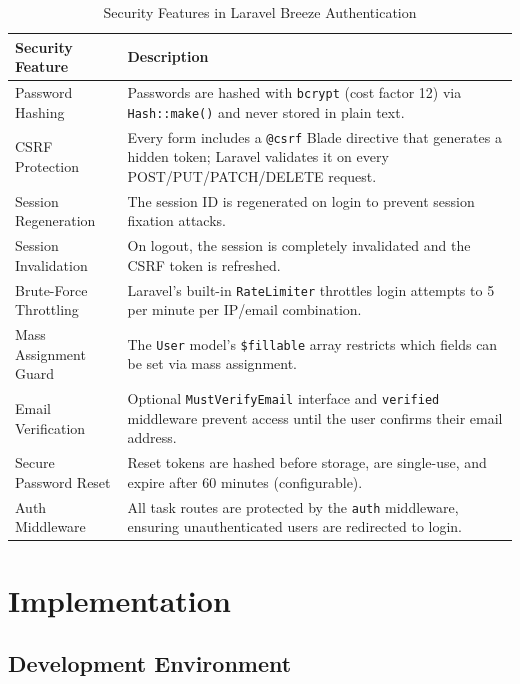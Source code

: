 \documentclass[12pt,a4paper]{report}
\begin{document}
\begin{titlepage}
\begin{table}[h!]
\centering
\caption{Security Features in Laravel Breeze Authentication}
\label{tab:security}
\renewcommand{\arraystretch}{1.3}
\begin{tabularx}{\textwidth}{@{}lX@{}}
\toprule
\textbf{Security Feature} & \textbf{Description} \\
\midrule
Password Hashing       & Passwords are hashed with \texttt{bcrypt} (cost factor 12) via \texttt{Hash::make()} and never stored in plain text. \\
CSRF Protection        & Every form includes a \texttt{@csrf} Blade directive that generates a hidden token; Laravel validates it on every POST/PUT/PATCH/DELETE request. \\
Session Regeneration   & The session ID is regenerated on login to prevent session fixation attacks. \\
Session Invalidation   & On logout, the session is completely invalidated and the CSRF token is refreshed. \\
Brute-Force Throttling & Laravel's built-in \texttt{RateLimiter} throttles login attempts to 5 per minute per IP/email combination. \\
Mass Assignment Guard  & The \texttt{User} model's \texttt{\$fillable} array restricts which fields can be set via mass assignment. \\
Email Verification     & Optional \texttt{MustVerifyEmail} interface and \texttt{verified} middleware prevent access until the user confirms their email address. \\
Secure Password Reset  & Reset tokens are hashed before storage, are single-use, and expire after 60 minutes (configurable). \\
Auth Middleware        & All task routes are protected by the \texttt{auth} middleware, ensuring unauthenticated users are redirected to login. \\
\bottomrule
\end{tabularx}
\end{table}

\chapter{Implementation}

\section{Development Environment}


\end{titlepage}
\end{document}
